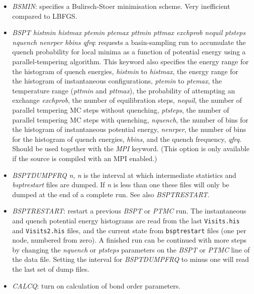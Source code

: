 \documentclass[12pt,a4paper,dvips]{article}
\begin{document}
\begin{itemize}
\item {\it BSMIN\/}: specifies a Bulirsch-Stoer minimisation scheme. 
Very inefficient compared to LBFGS.

\item {\it BSPT histmin histmax ptemin ptemax pttmin pttmax exchprob nequil ptsteps nquench nenrper hbins qfrq\/}: 
requests a basin-sampling run to accumulate the quench probability for local minima 
as a function of potential energy using 
a parallel-tempering algorithm. 
This keyword also specifies the energy range for the histogram of quench energies,
{\it histmin\/} to {\it histmax\/},
the energy range for the histogram of instantaneous configurations, {\it ptemin} to {\it ptemax}, 
the temperature range ({\it pttmin} and {\it pttmax}), 
the probability of attempting an exchange {\it exchprob}, the 
number of equilibration steps, {\it nequil},
the number of parallel tempering MC steps without quenching,  {\it ptsteps},
the number of parallel tempering MC steps with quenching,  {\it nquench},
the number of bins for the histogram of instantaneous potential energy, {\it nenrper},
the number of bins for the histogram of quench energies, {\it hbins},  
and the quench frequency, {\it qfrq}.  
Should be used together with the {\it MPI\/} keyword. %
(This option is only available if the source is compiled with an MPI enabled.)  

\item {\it BSPTDUMPFRQ n\/}, {\it n\/} is the interval at which intermediate statistics
and {\it bsptrestart\/} files are dumped. If {\it n\/} is less than one these files
will only be dumped at the end of a complete run. 
See also {\it BSPTRESTART\/}.

\item {\it BSPTRESTART\/}: restart a previous {\it BSPT\/} or {\it PTMC\/} run.
The instantaneous and quench potential energy histograms are read from the last
{\tt Visits.his} and {\tt Visits2.his} files, and the current state from 
{\tt bsptrestart} files (one per node, numbered from zero).
A finished run can be continued with more steps by changing the {\it nquench} 
or {\it ptsteps} parameters on the {\it BSPT\/} or {\it PTMC\/} line of
the data file. Setting the interval for {\it BSPTDUMPFRQ} to
minus one will read the last set of dump files.


\item {\it CALCQ\/}: turn on calculation of bond order parameters.


\end{itemize}
\end{document}
